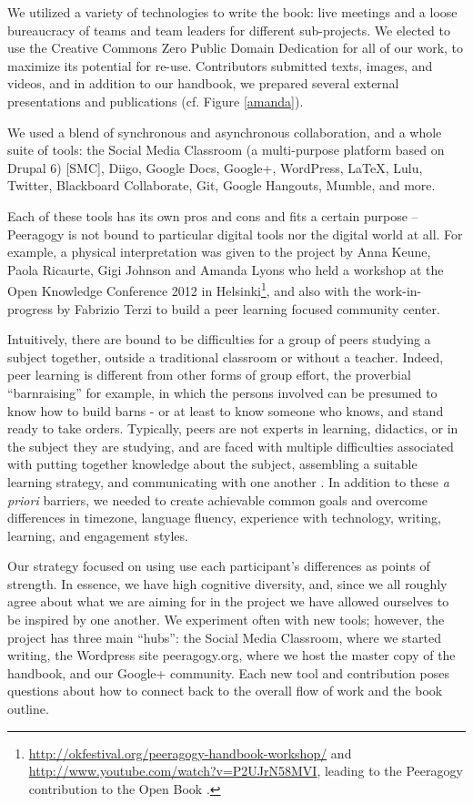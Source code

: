 \documentclass{acm_proc_article-sp}
\begin{document}
We utilized a variety of technologies to write the book: live
meetings and a loose bureaucracy of teams and team leaders for
different sub-projects. We elected to use the Creative Commons Zero
Public Domain Dedication for all of our work, to maximize its
potential for re-use. Contributors submitted texts, images, and
videos, and in addition to our handbook, we prepared several external
presentations and publications (cf. Figure \ref{amanda}).

We used a blend of synchronous and asynchronous collaboration, and a
whole suite of tools: the Social Media Classroom (a multi-purpose platform based on Drupal 6) [SMC], Diigo, Google Docs, Google+, WordPress, LaTeX, Lulu, Twitter, Blackboard Collaborate, Git, Google Hangouts, Mumble, and more.

Each of these tools has its own pros and cons and fits a certain
purpose -- Peeragogy is not bound to particular digital tools nor the
digital world at all. For example, a physical interpretation was
given to the project by Anna Keune, Paola Ricaurte, Gigi Johnson and Amanda Lyons who held a
workshop at the Open Knowledge Conference 2012 in Helsinki\footnote{
  \url{http://okfestival.org/peeragogy-handbook-workshop/} and
  \url{http://www.youtube.com/watch?v=P2UJrN58MVI}, leading to the
  Peeragogy contribution to the Open Book \cite{PeeragogyinAction}.},
and also with the work-in-progress by Fabrizio Terzi to build a peer learning focused community center.

Intuitively, there are bound to be difficulties for a group of peers studying a subject together, outside a traditional classroom or without a teacher. Indeed, peer learning is different from other forms of group effort, the proverbial ``barnraising'' for example, in which the persons involved can be presumed to know how to build barns - or at least to know someone who knows, and stand ready to take orders. Typically, peers are not experts in learning, didactics, or in the subject they are studying, and are faced with multiple difficulties associated with putting together knowledge about the subject, assembling a suitable learning strategy, and communicating with one another \cite{paragogy}. In addition to these \emph{a priori} barriers, we needed to create achievable common goals and overcome differences in timezone, language fluency, experience with technology, writing, learning, and engagement styles.

Our strategy focused on using use each participant's differences as
points of strength. In essence, we have high cognitive diversity, and, since we all roughly agree about what we are
aiming for in the project we have allowed ourselves to be
inspired by one another. We experiment often with new tools; however, the project has three main ``hubs'':
the Social Media Classroom, where we started writing, the Wordpress
site peeragogy.org, where we host the master copy of the handbook, and
our Google+ community. Each new tool and contribution poses questions
about how to connect back to the overall flow of work and the book
outline.
\end{document}
